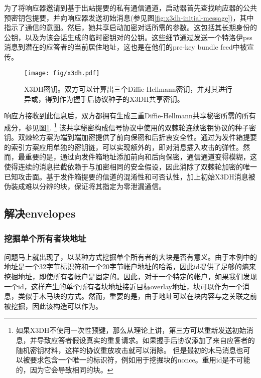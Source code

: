 为了将响应器邀请到基于出站提要的私有通信通道，启动器首先查找响应器的公共预密钥包提要，并向响应器发送初始消息(参见图\ref{fig:x3dh-initial-message})，其中指示了通信的意图。然后，她共享启动加密对话所需的参数。这包括其长期身份的公钥，以及为该会话生成的临时密钥对的公钥。这些细节通过发送一个特洛伊pss消息到潜在的应答者的当前居住地址，这也是在他们的pre-key bundle feed中被宣传。 

\begin{figure}[htbp]
   \centering
   \texttt{[image: fig/x3dh.pdf]}
   \caption[X3DH密钥\statusgreen]{X3DH密钥。双方可以计算出三个Diffie-Hellmann密钥，并对其进行异或，得到作为握手后协议种子的X3DH共享密钥。}
   \label{fig:x3dh}
\end{figure}

响应方接收到此信息后，双方都拥有生成三重Diffie-Hellmann共享秘密所需的所有成分，参见图\ref{fig:x3dh}.%
%
\footnote{如果X3DH不使用一次性预键，那么从理论上讲，第三方可以重新发送初始消息，并导致应答者假设真实的重复请求。如果握手后协议添加了来自应答者的随机密钥材料，这样的协议重放攻击就可以消除。
但是最初的木马消息也可以被要求包含一个唯一的标识符，例如用于挖掘块的nonce。重用id是不可能的，因为它会导致相同的块。}
%
该共享秘密构成信号协议中使用的双棘轮连续密钥协议的种子密钥。双棘轮方案为端到端加密提供了前向保密和后折衷安全性。通过为发件箱提要的索引方案应用单独的密钥链，可以实现额外的，即对消息插入攻击的弹性。然而，最重要的是，通过向发件箱地址添加前向和后向保密，通信通道变得模糊，这使得连续的消息拦截依赖于与加密相同的安全假设，因此消除了双棘轮加密的唯一已知攻击面。基于发件箱提要的信道的混淆性和可否认性，加上初始X3DH消息被伪装成难以分辨的块，保证将其指定为零泄漏通信。

\subsection{解决envelopes\statusgreen}\label{sec:addressed-envelopes}

\subsubsection{挖掘单个所有者块地址}

问题马上就出现了，以某种方式挖掘单个所有者的大块是否有意义。由于本例中的地址是一个32字节标识符和一个20字节帐户地址的哈希，因此id提供了足够的熵来挖掘地址，即使所有者帐户是固定的。因此，对于一个特定的帐户，如果我们发现一个id，这样产生的单个所有者块地址接近目标overlay地址，块可以作为一个消息，类似于木马块的方式。然而，重要的是，由于地址可以在块内容与之关联之前被挖掘，因此该构造可以作为。

